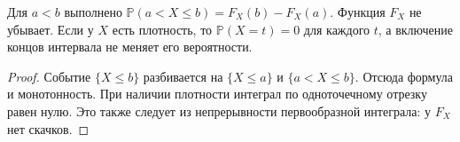 \ifdim\dimexpr\ht\CatFlowBox+\dp\CatFlowBox\relax<64mm\dp\CatFlowBox=\dimexpr64mm-\ht\CatFlowBox\relax\fi%
\noindent\usebox{\CatFlowBox}\par\addvspace{5pt}
\begin{theorem}
Для \(a<b\) выполнено \(\mathbb P(a<X\le b)=F_X(b)-F_X(a)\). Функция \(F_X\) не убывает. Если у \(X\) есть плотность, то \(\mathbb P(X=t)=0\) для каждого \(t\), а включение концов интервала не меняет его вероятности.
\end{theorem}
\begin{proof}Событие \(\{X\le b\}\) разбивается на \(\{X\le a\}\) и \(\{a<X\le b\}\). Отсюда формула и монотонность. При наличии плотности интеграл по одноточечному отрезку равен нулю. Это также следует из непрерывности первообразной интеграла: у \(F_X\) нет скачков.\end{proof}
